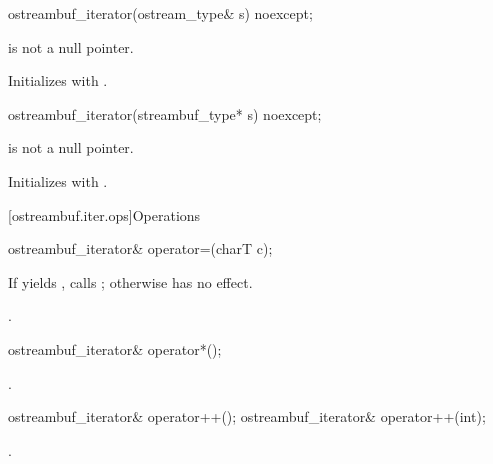 %
\begin{itemdecl}
ostreambuf_iterator(ostream_type& s) noexcept;
\end{itemdecl}

\begin{itemdescr}
\pnum
\expects
{}
is not a null pointer.

\pnum
\effects
Initializes  with .
\end{itemdescr}


%
\begin{itemdecl}
ostreambuf_iterator(streambuf_type* s) noexcept;
\end{itemdecl}

\begin{itemdescr}
\pnum
\expects
{}
is not a null pointer.

\pnum
\effects
Initializes  with .
\end{itemdescr}

[ostreambuf.iter.ops]{Operations}

%
\begin{itemdecl}
ostreambuf_iterator& operator=(charT c);
\end{itemdecl}

\begin{itemdescr}
\pnum
\effects
If
yields
,
calls
;
otherwise has no effect.

\pnum
\returns
{}.
\end{itemdescr}

%
\begin{itemdecl}
ostreambuf_iterator& operator*();
\end{itemdecl}

\begin{itemdescr}
\pnum
\returns
{}.
\end{itemdescr}

%
\begin{itemdecl}
ostreambuf_iterator& operator++();
ostreambuf_iterator& operator++(int);
\end{itemdecl}

\begin{itemdescr}
\pnum
\returns
{}.
\end{itemdescr}

